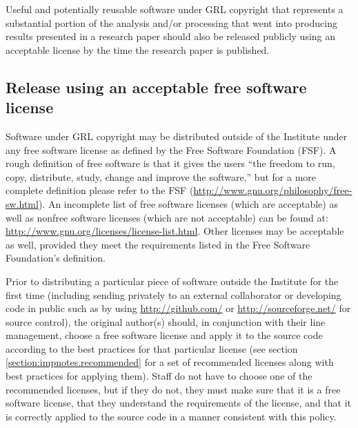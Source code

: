 \documentclass[10pt,a4paper]{article}
\begin{document}
\par Useful and potentially reusable software under GRL copyright that 
represents a substantial portion of the analysis and/or processing that went into 
producing results presented in a research paper should also be released 
publicly using an acceptable license by the time the research paper is 
published. 


\subsection{Release using an acceptable free software license}
\label{section:policy.licenses}
\par Software under GRL copyright may be distributed outside of 
the Institute under any free software license as defined by the Free 
Software Foundation (FSF). A rough definition of free software is that it gives 
the users ``the freedom to run, copy, distribute, study, change and improve 
the software,'' but for a more complete definition please refer to the FSF 
(\url{http://www.gnu.org/philosophy/free-sw.html}). An incomplete list of free 
software licenses (which are acceptable) as well as nonfree software licenses 
(which are not acceptable) can be found at: 
\url{http://www.gnu.org/licenses/license-list.html}. Other licenses may be 
acceptable as well, provided they meet the requirements listed in the Free 
Software Foundation's definition. 

\par Prior to distributing a particular piece of software outside the Institute for the 
first time (including sending privately to an external collaborator or developing 
code in public such as by using \url{http://github.com/} or 
\url{http://sourceforge.net/} for source control), the original author(s) should, in 
conjunction with their line management, choose a free software license and apply 
it to the source code according to the best practices for that particular license 
(see section \ref{section:impnotes.recommended} for a set of recommended 
licenses along with best practices for applying them). Staff do not have to choose 
one of the recommended licenses, but if they do not, they must make sure that it 
is a free software license, that they understand the requirements of the license, 
and that it is correctly applied to the source code in a manner consistent with 
this policy. 
\end{document}
